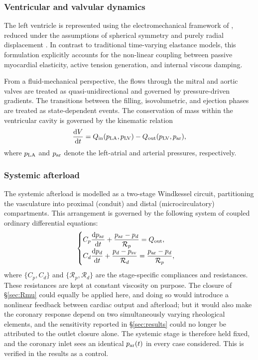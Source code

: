 \documentclass[lineno]{jfm}
\begin{document}
\subsubsection*{Ventricular and valvular dynamics}

The left ventricle is represented using the electromechanical framework of \cite{chapelle2012energy}, reduced under the assumptions of spherical symmetry and purely radial displacement \citep{caruel2014dimensional}. In contrast to traditional time-varying elastance models, this formulation explicitly accounts for the non-linear coupling between passive myocardial elasticity, active tension generation, and internal viscous damping. 

From a fluid-mechanical perspective, the flows through the mitral and aortic valves are treated as quasi-unidirectional and governed by pressure-driven gradients. The transitions between the filling, isovolumetric, and ejection phases are treated as state-dependent events. The conservation of mass within the ventricular cavity is governed by the kinematic relation
\begin{equation}
\frac{\mathrm{d}V}{\mathrm{d}t} = Q_{\rm in}(p_{\rm LA},p_{\rm LV}) - Q_{\rm out}(p_{\rm LV},p_{\rm ar}),
\end{equation}
where $p_{\rm LA}$ and $p_{\rm ar}$ denote the left-atrial and arterial pressures, respectively.

\subsubsection*{Systemic afterload}

The systemic afterload is modelled as a two-stage Windkessel circuit, partitioning the vasculature into proximal (conduit) and distal (microcirculatory) compartments. This arrangement is governed by the following system of coupled ordinary differential equations:
\begin{equation}
\begin{cases}
C_p \dfrac{\mathrm{d}p_{\rm ar}}{\mathrm{d}t} + \dfrac{p_{\rm ar} - p_d}{\mathcal{R}_{p}} = Q_{\rm out}, \\
C_d \dfrac{\mathrm{d}p_d}{\mathrm{d}t} + \dfrac{p_d - p_{\rm sv}}{\mathcal{R}_{d}} = \dfrac{p_{\rm ar} - p_d}{\mathcal{R}_{p}},
\end{cases}
\end{equation}
where $\{C_p, C_d\}$ and $\{\mathcal{R}_{p}, \mathcal{R}_{d}\}$ are the
stage-specific compliances and resistances. These resistances are kept at
constant viscosity on purpose. The closure of \S\ref{sec:Rmu} could equally be
applied here, and doing so would introduce a nonlinear feedback between cardiac
output and afterload; but it would also make the coronary response depend on two
simultaneously varying rheological elements, and the sensitivity reported in
\S\ref{sec:results} could no longer be attributed to the outlet closure alone.
The systemic stage is therefore held fixed, and the coronary inlet sees an
identical $p_{\rm ar}(t)$ in every case considered. This is verified in the
results as a control.
\end{document}
